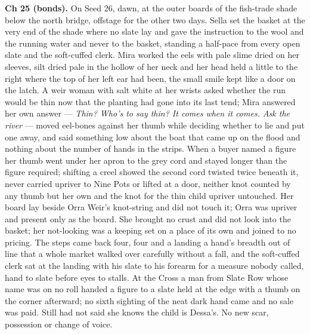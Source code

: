 \documentclass{design/chronicle}
\begin{document}
{\textbf{Ch 25 (bonds).} On Seed 26, dawn, at the outer boards of the fish-trade shade below the north bridge, offstage for the other two days. Sella set the basket at the very end of the shade where no slate lay and gave the instruction to the wool and the running water and never to the basket, standing a half-pace from every open slate and the soft-cuffed clerk. Mira worked the eels with pale slime dried on her sleeves, silt dried pale in the hollow of her neck and her head held a little to the right where the top of her left ear had been, the small smile kept like a door on the latch. A weir woman with salt white at her wrists asked whether the run would be thin now that the planting had gone into its last tend; Mira answered her own answer — \emph{Thin? Who’s to say thin? It comes when it comes. Ask the river} — moved eel-bones against her thumb while deciding whether to lie and put one away, and said something low about the boat that came up on the flood and nothing about the number of hands in the strips. When a buyer named a figure her thumb went under her apron to the grey cord and stayed longer than the figure required; shifting a creel showed the second cord twisted twice beneath it, never carried upriver to Nine Pots or lifted at a door, neither knot counted by any thumb but her own and the knot for the thin child upriver untouched. Her board lay beside Orra Weir’s knot-string and did not touch it; Orra was upriver and present only as the board. She brought no crust and did not look into the basket; her not-looking was a keeping set on a place of its own and joined to no pricing. The steps came back four, four and a landing a hand’s breadth out of line that a whole market walked over carefully without a fall, and the soft-cuffed clerk sat at the landing with his slate to his forearm for a measure nobody called, hand to slate before eyes to stalls. At the Cross a man from Slate Row whose name was on no roll handed a figure to a slate held at the edge with a thumb on the corner afterward; no sixth sighting of the neat dark hand came and no sale was paid. Still had not said she knows the child is Dessa’s. No new scar, possession or change of voice.

}
\end{document}
